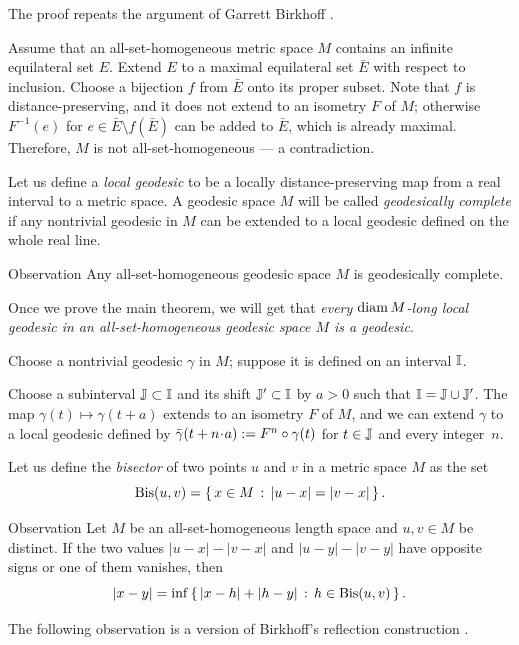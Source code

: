 \documentclass[leqno,a4paper,10pt]{article}
\begin{document}
The proof repeats the argument of Garrett Birkhoff \cite[Theorem 18]{birkhoff}.

Assume that an all-set-homogeneous metric space $M$ contains an infinite equilateral set $E$.
Extend $E$ to a maximal equilateral set $\bar E$ with respect to inclusion.
Choose a bijection $f$ from $\bar E$ onto its proper subset.
Note that $f$ is distance-preserving, and it does not extend to an isometry $F$ of $M$;
otherwise $F^{-1}(e)$ for $e\in \bar E\setminus f(\bar E)$ can be added to $\bar E$, which is already maximal.
Therefore, $M$ is not all-set-homogeneous --- a contradiction.
\qeds

Let us define a \emph{local geodesic} to be a locally distance-preserving map from a real interval to a metric space.
A geodesic space $M$ will be called \emph{geodesically complete}
if any nontrivial geodesic in $M$ can be extended to a local geodesic defined on the whole real line.

\begin{thm}{Observation}\label{obs:geodesically-complete}
Any all-set-homogeneous geodesic space $M$ is geodesically complete.
\end{thm}

Once we prove the main theorem, we will get that \emph{every $\operatorname{\rm diam} M$-long local geodesic in an all-set-homogeneous geodesic space $M$ is a geodesic}.

Choose a nontrivial geodesic $\gamma$ in $M$;
suppose it is defined on an interval $\mathbb{I}$.

Choose a subinterval $\mathbb{J}\subset \mathbb{I}$ and its shift $\mathbb{J}'\subset \mathbb{I}$ by $a>0$ such that $\mathbb{I}=\mathbb{J}\cup\mathbb{J}'$.
The map $\gamma(t)\mapsto \gamma(t+a)$ extends to an isometry $F $ of $M$,
and we can extend $\gamma$ to a local geodesic defined by $\bar\gamma(t+n\cdot a)\df F^n\circ \gamma(t)$
for $t\in \mathbb{J}$ and every integer~$n$.
\qeds

Let us define the \emph{bisector} of two points $u$ and $v$ in a metric space $M$ as the set
\[\mathop{\rm Bis}\nolimits(u,v)=\left\{\,{x\in M}\,:\,{|u-x|=|v-x|}\,\right\}.\]

\begin{thm}{Observation}\label{lem:bisector}
Let $M$ be an all-set-homogeneous length space and $u,v\in M$ be distinct.
If  the two values $|u-x|-|v-x|$ and $|u-y|-|v-y|$ have opposite signs or one of them vanishes, then
\[|x-y|=\inf\left\{\,{|x-h|+|h-y|}\,:\,{h\in \mathop{\rm Bis}\nolimits(u,v)}\,\right\}.\]
\end{thm}

The following observation is a version of Birkhoff's reflection construction
\cite[Theorem 20]{birkhoff}.
\end{document}
